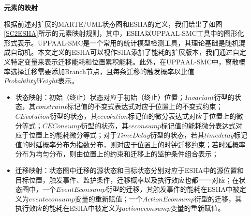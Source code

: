 	\textbf{元素的映射}
	
	根据前述对扩展的MARTE/UML状态图和ESHA的定义，我们给出了如图\ref{SC2ESHA}所示的元素映射规则，其中，ESHA以UPPAAL-SMC工具中的图形化形式表示。UPPAAL-SMC是一个常用的统计模型检测工具，其理论基础是随机混成自动机。本文定义的ESHA可以视作SHA添加了能耗的扩展版本，我们通过自定义特定变量来表示迁移能耗和位置累积能耗。此外，在UPPAAL-SMC中，离散概率选择迁移需要添加Branch节点，且每条迁移的触发概率以比值$Probability Weight$表示。
	
	\begin{itemize}
	\item 状态映射：初始（终止）状态对应于初始（终止）位置；$Invariant$衍型的状态，其$constraint$标记值的不变式表达式对应于位置上的不变式约束；$CEvolution$衍型的状态，其$cevolution$标记值的微分表达式对应于位置上的微分等式；$CEConsump$衍型的状态，其$ceconsump$标记值的能耗微分表达式对应于位置上的能耗微分等式；对于$TimeDelay$衍型的状态，若其$timedelay$标记值的时延概率分布为指数分布，则对应于位置上的时钟迁移约束；若时延概率分布为均匀分布，则由位置上的约束和迁移上的监护条件组合表示；
	\item 迁移映射：状态图中迁移的源状态和目标状态分别对应于ESHA中的源位置和目标位置，触发事件、监护条件，迁移概率以及执行效应也都一一对应；在状态图中，一个$EventEconsump$衍型的迁移，其触发事件的能耗在ESHA中被定义为$eventeconsump$变量的重新赋值；一个$ActionEconsump$衍型的迁移，其执行效应的能耗在ESHA中被定义为$actioneconsump$变量的重新赋值。
	\end{itemize}
	

